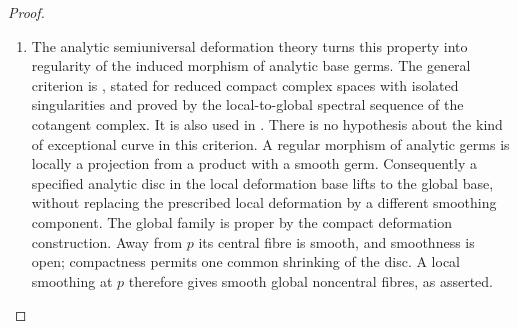 \begin{proof}
\begin{enumerate}[label=\arabic*.,leftmargin=*]
\item The analytic semiuniversal deformation theory turns this
property into regularity of the induced morphism of analytic
base germs.  The general criterion is
\citet[Lemma~1, p.~93]{Manetti1991D}, stated for reduced compact
complex spaces with isolated singularities and proved by the
local-to-global spectral sequence of the cotangent complex.
It is also used in
\citet[Section~3.2, Proposition~3.3 and the discussion preceding
Proposition~3.4]{DlousskyTeleman2020D}.
There is no hypothesis about the kind of exceptional curve
in this criterion.  A regular morphism of analytic
germs is locally a projection from a product with a smooth
germ.  Consequently a specified analytic disc in the local
deformation base lifts to the global base, without replacing
the prescribed local deformation by a different smoothing
component.
The global family is proper by the compact deformation
construction.  Away from $p$ its central fibre is smooth,
and smoothness is open; compactness permits one common
shrinking of the disc.  A local smoothing at $p$ therefore
gives smooth global noncentral fibres, as asserted.
\end{enumerate}
\end{proof}

